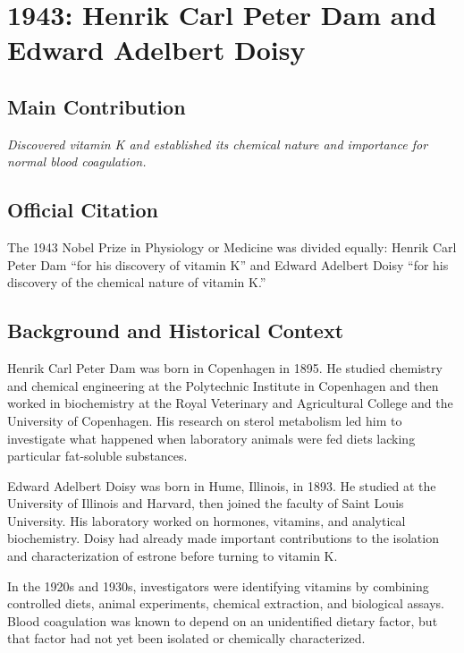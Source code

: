 \chapter[1943 --- Dam and Doisy]{1943: Henrik Carl Peter Dam and Edward Adelbert Doisy}
\label{ch:1943_Dam}

\section*{Main Contribution}

\textit{Discovered vitamin K and established its chemical nature and importance for normal blood coagulation.}\cite{nobel-1943,lecture-1943}

\section{Official Citation}

The 1943 Nobel Prize in Physiology or Medicine was divided equally: Henrik Carl Peter Dam ``for his discovery of vitamin K'' and Edward Adelbert Doisy ``for his discovery of the chemical nature of vitamin K.''

\section{Background and Historical Context}

Henrik Carl Peter Dam was born in Copenhagen in 1895. He studied chemistry and chemical engineering at the Polytechnic Institute in Copenhagen and then worked in biochemistry at the Royal Veterinary and Agricultural College and the University of Copenhagen. His research on sterol metabolism led him to investigate what happened when laboratory animals were fed diets lacking particular fat-soluble substances.

Edward Adelbert Doisy was born in Hume, Illinois, in 1893. He studied at the University of Illinois and Harvard, then joined the faculty of Saint Louis University. His laboratory worked on hormones, vitamins, and analytical biochemistry. Doisy had already made important contributions to the isolation and characterization of estrone before turning to vitamin K.

In the 1920s and 1930s, investigators were identifying vitamins by combining controlled diets, animal experiments, chemical extraction, and biological assays. Blood coagulation was known to depend on an unidentified dietary factor, but that factor had not yet been isolated or chemically characterized.

